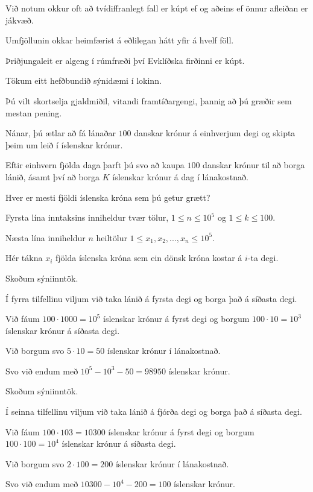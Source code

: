 {
	{
		\item<1-> Við notum okkur oft að tvídiffranlegt fall er kúpt ef og aðeins ef önnur afleiðan er jákvæð.
		\item<2-> Umfjöllunin okkar heimfærist á eðlilegan hátt yfir á hvelf föll.
		\item<3-> Þriðjungaleit er algeng í rúmfræði því Evklíðska firðinni er kúpt.
	}
}

{
}

{
	{
		\item<1-> Tökum eitt hefðbundið sýnidæmi í lokinn.
		\item<2-> Þú vilt skortselja gjaldmiðil, vitandi framtíðargengi, þannig að þú græðir sem mestan pening.
		\item<3-> Nánar, þú ætlar að fá lánaðar $100$ danskar krónur á einhverjum degi og skipta þeim um leið í íslenskar krónur.
		\item<4-> Eftir einhvern fjölda daga þarft þú svo að kaupa $100$ danskar krónur til að borga lánið,
					ásamt því að borga $K$ íslenskar krónur á dag í lánakostnað.
		\item<5-> Hver er mesti fjöldi íslenska króna sem þú getur grætt?
		\item<6-> Fyrsta lína inntaksins inniheldur tvær tölur, $1 \leq n \leq 10^5$ og $1 \leq k \leq 100$.
		\item<7-> Næsta lína inniheldur $n$ heiltölur $1 \leq x_1, x_2, ..., x_n \leq 10^5$.
		\item<8-> Hér tákna $x_i$ fjölda íslenska króna sem ein dönsk króna kostar á $i$-ta degi.
	}
}

{
	{
		\item<1-> Skoðum sýniinntök.
		\item<2->[]
		\item<3-> Í fyrra tilfellinu viljum við taka lánið á fyrsta degi og borga það á síðasta degi.
		\item<4-> Við fáum $100 \cdot 1000 = 10^5$ íslenskar krónur á fyrst degi og borgum $100 \cdot 10 = 10^3$ íslenskar krónur á síðasta degi.
		\item<5-> Við borgum svo $5 \cdot 10 = 50$ íslenskar krónur í lánakostnað.
		\item<6-> Svo við endum með $10^5 - 10^3 - 50 = 98950$ íslenskar krónur.
	}
}

{
	{
		\item<1-> Skoðum sýniinntök.
		\item<1->[]
		\item<1-> Í seinna tilfellinu viljum við taka lánið á fjórða degi og borga það á síðasta degi.
		\item<2-> Við fáum $100 \cdot 103 = 10300$ íslenskar krónur á fyrst degi og borgum $100 \cdot 100 = 10^4$ íslenskar krónur á síðasta degi.
		\item<3-> Við borgum svo $2 \cdot 100 = 200$ íslenskar krónur í lánakostnað.
		\item<4-> Svo við endum með $10300 - 10^4 - 200 = 100$ íslenskar krónur.
	}
}


